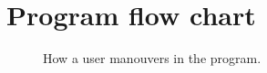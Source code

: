 
\section{Program flow chart}

\begin{figure}[ht]
	\capstart
	\def\svgwidth{\textwidth}
	
	\caption[Program flow chart]{How a user manouvers in the program.}
	\label{fig:program_flow_chart}
\end{figure}

